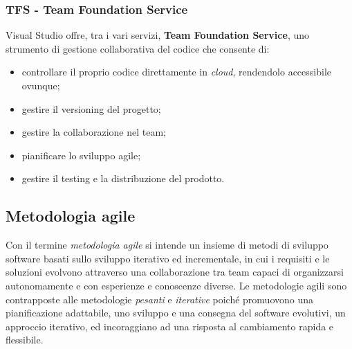 \subsubsection{TFS - Team Foundation Service}
Visual Studio offre, tra i vari servizi, \textbf{Team Foundation Service}, uno strumento di gestione collaborativa del codice che consente di:
\begin{itemize}
\item controllare il proprio codice direttamente in \textit{cloud}, rendendolo accessibile ovunque;
\item gestire il versioning del progetto;
\item gestire la collaborazione nel team;
\item pianificare lo sviluppo agile;
\item gestire il testing e la distribuzione del prodotto.
\end{itemize}

\subsection{Metodologia agile}
Con il termine \textit{metodologia agile} si intende un insieme di metodi di sviluppo software basati sullo sviluppo iterativo ed incrementale, in cui i requisiti e le soluzioni evolvono attraverso una collaborazione tra team capaci di organizzarsi autonomamente e con esperienze e conoscenze diverse.
Le metodologie agili sono contrapposte alle metodologie \textit{pesanti} e \textit{iterative} poiché promuovono una pianificazione adattabile, uno sviluppo e una consegna del software evolutivi, un approccio iterativo, ed incoraggiano ad una risposta al cambiamento rapida e flessibile.

